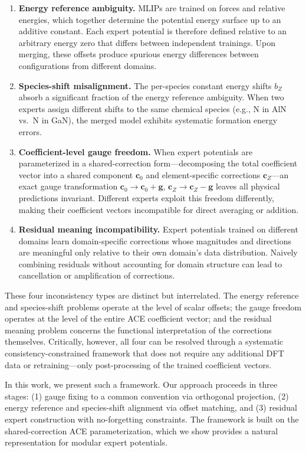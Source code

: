 \documentclass[twoside,prb,aps,floatfix,superscriptaddress,longbibliography]{revtex4-2}
\newcommand{\g}{\mathbf{g}}
\newcommand{\cZ}{\mathbf{c}_{Z}}
\newcommand{\cb}{\mathbf{c}_{0}}
\begin{document}
\begin{enumerate}[label=\textbf{(I\arabic*)}]
    \item \textbf{Energy reference ambiguity.} MLIPs are trained on forces and relative energies, which together determine the potential energy surface up to an additive constant. Each expert potential is therefore defined relative to an arbitrary energy zero that differs between independent trainings. Upon merging, these offsets produce spurious energy differences between configurations from different domains.
    \item \textbf{Species-shift misalignment.} The per-species constant energy shifts $b_Z$ absorb a significant fraction of the energy reference ambiguity. When two experts assign different shifts to the same chemical species (e.g., N in AlN vs.~N in GaN), the merged model exhibits systematic formation energy errors.
    \item \textbf{Coefficient-level gauge freedom.} When expert potentials are parameterized in a shared-correction form---decomposing the total coefficient vector into a shared component $\cb$ and element-specific corrections $\cZ$---an exact gauge transformation $\cb \to \cb + \g$, $\cZ \to \cZ - \g$ leaves all physical predictions invariant. Different experts exploit this freedom differently, making their coefficient vectors incompatible for direct averaging or addition.
    \item \textbf{Residual meaning incompatibility.} Expert potentials trained on different domains learn domain-specific corrections whose magnitudes and directions are meaningful only relative to their own domain's data distribution. Naively combining residuals without accounting for domain structure can lead to cancellation or amplification of corrections.
\end{enumerate}

These four inconsistency types are distinct but interrelated. The energy reference and species-shift problems operate at the level of scalar offsets; the gauge freedom operates at the level of the entire ACE coefficient vector; and the residual meaning problem concerns the functional interpretation of the corrections themselves. Critically, however, all four can be resolved through a systematic consistency-constrained framework that does not require any additional DFT data or retraining---only post-processing of the trained coefficient vectors.

In this work, we present such a framework. Our approach proceeds in three stages: (1) gauge fixing to a common convention via orthogonal projection, (2) energy reference and species-shift alignment via offset matching, and (3) residual expert construction with no-forgetting constraints. The framework is built on the shared-correction ACE parameterization, which we show provides a natural representation for modular expert potentials.
\end{document}
